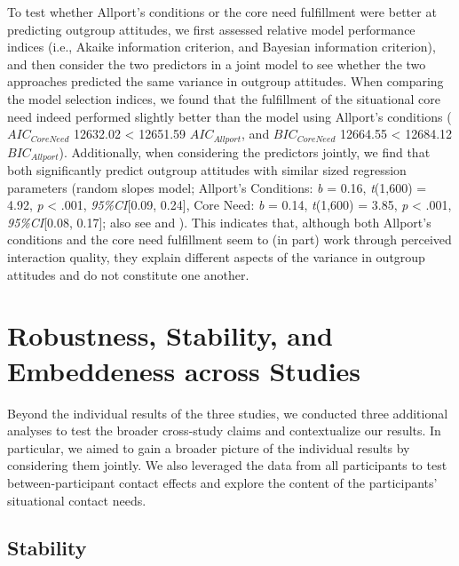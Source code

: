 To test whether Allport's conditions or the core need fulfillment were
better at predicting outgroup attitudes, we first assessed relative
model performance indices (i.e., Akaike information criterion, and
Bayesian information criterion), and then consider the two predictors in
a joint model to see whether the two approaches predicted the same
variance in outgroup attitudes. When comparing the model selection
indices, we found that the fulfillment of the situational core need
indeed performed slightly better than the model using Allport's
conditions (\(AIC_{CoreNeed}\) 12632.02 \textless{} 12651.59
\(AIC_{Allport}\), and \(BIC_{CoreNeed}\) 12664.55 \textless{} 12684.12
\(BIC_{Allport}\)). Additionally, when considering the predictors
jointly, we find that both significantly predict outgroup attitudes with
similar sized regression parameters (random slopes model; Allport's
Conditions: \textit{b} = 0.16, \textit{t}(1,600) = 4.92, \textit{p}
\textless{} .001, \textit{95\%CI}{[}0.09, 0.24{]}, Core Need: \textit{b}
= 0.14, \textit{t}(1,600) = 3.85, \textit{p} \textless{} .001,
\textit{95\%CI}{[}0.08, 0.17{]}; also see
 and
). This indicates that, although both
Allport's conditions and the core need fulfillment seem to (in part)
work through perceived interaction quality, they explain different
aspects of the variance in outgroup attitudes and do not constitute one
another.

\section{Robustness, Stability, and Embeddeness across Studies}

Beyond the individual results of the three studies, we conducted three
additional analyses to test the broader cross-study claims and
contextualize our results. In particular, we aimed to gain a broader
picture of the individual results by considering them jointly. We also
leveraged the data from all participants to test between-participant
contact effects and explore the content of the participants' situational
contact needs.

\subsection{Stability}

